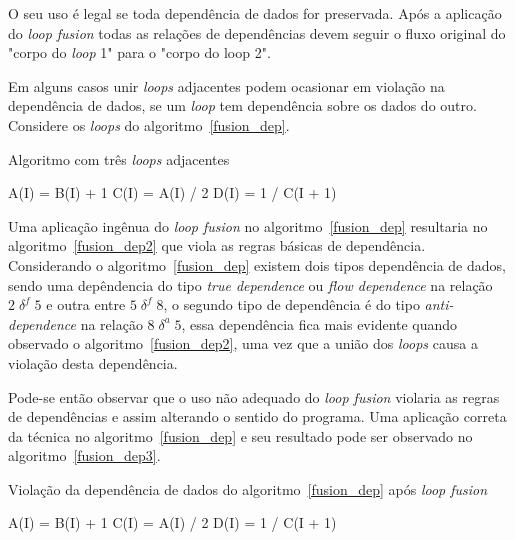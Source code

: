 O seu uso é legal se toda dependência de dados for preservada. 
Após a aplicação do \textit{loop fusion} todas as relações de dependências devem 
seguir o fluxo original do "corpo do \textit{loop} 1" para o "corpo do loop
2".

Em alguns casos unir \textit{loops} adjacentes podem ocasionar em violação na
dependência de dados, se um \textit{loop} tem dependência sobre os dados do
outro. Considere os \textit{loops} do algoritmo~\ref{fusion_dep}.

\begin{algorithm}
\caption{Algoritmo com três \textit{loops} adjacentes}
\label{fusion_dep}
\begin{algorithmic}[1]

\STATE A(I) = B(I) + 1
\ENDFOR
{}
\STATE C(I) = A(I) / 2
\ENDFOR
{}
\STATE D(I) = 1 / C(I + 1)
\ENDFOR

\end{algorithmic}
\end{algorithm}

Uma aplicação ingênua do \textit{loop fusion} no algoritmo~\ref{fusion_dep} 
resultaria no algoritmo~\ref{fusion_dep2} que viola as regras básicas de 
dependência.
Considerando o algoritmo~\ref{fusion_dep} existem dois tipos dependência 
de dados, sendo uma depêndencia do tipo \textit{true dependence} ou 
\textit{flow dependence} na relação $2 \; \delta^f \; 5$ e outra entre 
$5 \; \delta^f \; 8$, o segundo tipo de dependência é do tipo
\textit{anti-dependence} na relação $8 \; \delta^a \; 5$, essa dependência
fica mais evidente quando observado o algoritmo~\ref{fusion_dep2}, 
uma vez que a união dos \textit{loops} causa a violação desta dependência. 

Pode-se então observar que o uso não adequado do \textit{loop fusion} violaria
as regras de dependências e assim alterando o sentido do programa. 
Uma aplicação correta da técnica no algoritmo~\ref{fusion_dep} e seu 
resultado pode ser observado no algoritmo~\ref{fusion_dep3}.

\begin{algorithm}
\caption{Violação da dependência de dados do algoritmo~\ref{fusion_dep} após
        \textit{loop fusion}}
\label{fusion_dep2}
\begin{algorithmic}[1]

\STATE A(I) = B(I) + 1
\STATE C(I) = A(I) / 2
\STATE D(I) = 1 / C(I + 1)
\ENDFOR

\end{algorithmic}
\end{algorithm}

